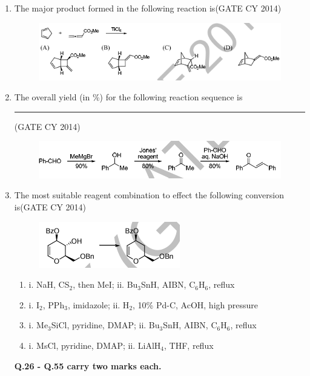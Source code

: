 \documentclass[a4paper,10pt]{exam}
\theoremstyle{remark}
\begin{document}
\begin{enumerate}
\item The major product formed in the following reaction is\hfill{(GATE CY 2014)}
\begin{figure}[H]
    \centering
    \includegraphics[width=1\columnwidth]{figs/Q 23.png}
    \caption{}
    \label{fig:placeholder}
\end{figure}
\item The overall yield (in \%) for the following reaction sequence is \rule{1.5cm}{0.15mm}\hfill{(GATE CY 2014)}
\begin{figure}[H]
    \centering
    \includegraphics[width=0.7\columnwidth]{figs/Q 24.png}
    \caption{}
    \label{fig:placeholder}
\end{figure}
\item The most suitable reagent combination to effect the following conversion is\hfill{(GATE CY 2014)}
\begin{figure}[H]
    \centering
    \includegraphics[width=0.5\columnwidth]{figs/Q 25.png}
    \caption{}
    \label{fig:placeholder}
\end{figure}
\begin{enumerate}
    \item i. NaH, CS$_2$, then MeI; \quad ii. Bu$_3$SnH, AIBN, C$_6$H$_6$, reflux

    \item i. I$_2$, PPh$_3$, imidazole; \quad ii. H$_2$, 10\% Pd-C, AcOH, high pressure

    \item i. Me$_3$SiCl, pyridine, DMAP; \quad ii. Bu$_3$SnH, AIBN, C$_6$H$_6$, reflux

    \item i. MsCl, pyridine, DMAP; \quad ii. LiAlH$_4$, THF, reflux
\end{enumerate}
\textbf{Q.26 - Q.55 carry two marks each.}


\end{enumerate}
\end{document}
